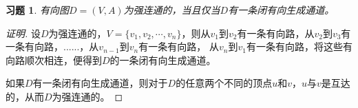 \documentclass{article}
\begin{document}
\begin{CJK}{UTF8}{gbsn}
\newtheorem*{Ex}{习题}
\begin{Ex}
有向图$D=(V,A)$为强连通的，当且仅当$D$有一条闭有向生成通道。
\end{Ex}
\begin{proof}[证明]
  设$D$为强连通的，$V=\{v_1,v_2,\cdots,v_n\}$，则从$v_1$到$v_2$有一条有向路，从$v_2$到$v_3$有一条有向路，......，从$v_{n-1}$到$v_n$有一条有向路，
  从$v_n$到$v_1$有一条有向路，将这些有向路顺次相连，便得到$D$的一条闭有向生成通道。

  如果$D$有一条闭有向生成通道，则对于$D$的任意两个不同的顶点$u$和$v$，$u$与$v$是互达的，从而$D$为强连通的。
\end{proof}
\end{CJK}
\end{document}
